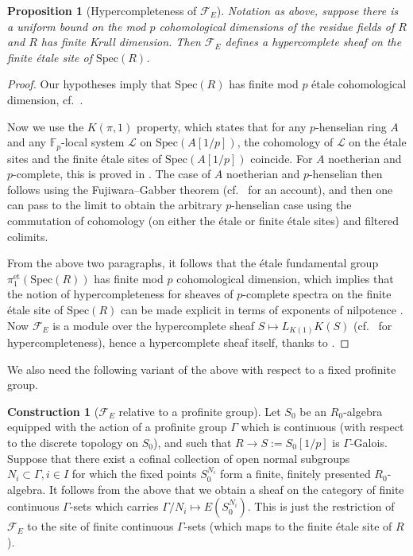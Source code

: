 \documentclass{amsart}
\newcommand{\sF}{\mathcal{F}}
\newtheorem{proposition}[theorem]{Proposition}
\theoremstyle{definition}
\newtheorem{construction}[theorem]{Construction}
\newcommand{\spec}{\mathrm{Spec}}
\begin{document}
\begin{proposition}[Hypercompleteness of $\sF_E$] 

\label{FEhypcomplete}
Notation as above, suppose there is a uniform bound on the mod $p$ cohomological dimensions of
the residue fields of $R$ and $R$ has finite Krull dimension. 
Then $\sF_E$ defines a hypercomplete sheaf on the finite \'etale site of
$\spec(R)$. 
\end{proposition} 


\begin{proof} 
Our hypotheses imply that $\spec(R)$ has finite mod $p$ \'etale
cohomological dimension, cf.~\cite[Cor.~3.29]{CM19}. 

Now we use 
the $K(\pi, 1)$ property, which states that for any $p$-henselian ring $A$ and
any $\mathbb{F}_p$-local system $\mathcal{L}$ on $\spec(A[1/p])$, the 
cohomology of $\mathcal{L}$ on the \'etale sites and the finite \'etale sites of
$\spec(A[1/p])$ coincide. 
For $A$ noetherian and $p$-complete, this is proved in \cite[Th.~4.9]{Sch13}. 
The case of $A$ noetherian and $p$-henselian then follows 
 using the Fujiwara--Gabber theorem
(cf.~\cite[Th.~6.11]{BM18} for an account), and then one can pass to the limit
to obtain the arbitrary $p$-henselian case using
 the commutation of cohomology (on either the \'etale or finite \'etale
 sites) and filtered colimits. 


From the above two paragraphs, 
it follows that the \'etale fundamental group $\pi_1^{\mathrm{et}}( \spec( R))$ has
finite mod $p$ cohomological dimension, which implies that the notion of
hypercompleteness for sheaves of $p$-complete spectra on the finite \'etale site
of $\spec(R)$ can be made explicit in terms of exponents of nilpotence
\cite[Sec.~4.1]{CM19}. 
Now
$\sF_E$ is a module over
the hypercomplete sheaf $S \mapsto L_{K(1)}K(S)$ (cf.~\cite[Th.~7.14]{CM19} for
hypercompleteness),
hence a hypercomplete sheaf itself, thanks to \cite[Cor.~4.26]{CM19}. 
\end{proof} 


We also need the following variant of the above with respect to a fixed
profinite group. 
\begin{construction}[$\sF_E$ relative to a profinite group] 
\label{relativeFE}
Let $S_0$ be an $R_0$-algebra equipped with the action of a profinite group $\Gamma$
which is continuous (with respect to the discrete topology on $S_0$), and such
that $R \to S := S_0[1/p]$ is $\Gamma$-Galois. 
Suppose that there exist a cofinal collection of open normal subgroups
$N_i \subset \Gamma, i \in I$ for which the fixed points $S_0^{N_i}$ form a
finite, finitely presented $R_0$-algebra. 
It follows from the above that we obtain a sheaf on the category of finite
continuous $\Gamma$-sets 
which carries $\Gamma/N_i \mapsto E( S_0^{N_i})$. 
This is just the restriction of $\sF_E$ to the site of finite continuous
$\Gamma$-sets (which maps to the finite \'etale site of $R$). 
\end{construction} 
\end{document}
